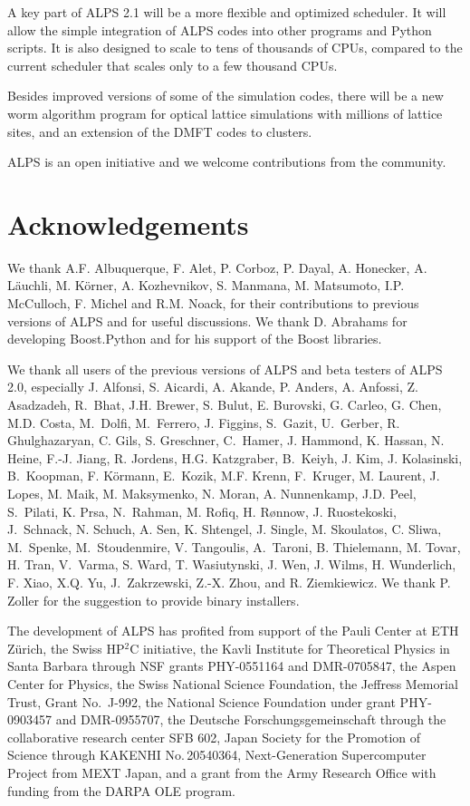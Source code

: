 \documentclass[12pt]{iopart}
\begin{document}
A key part of ALPS 2.1 will be a more flexible and optimized scheduler. It will allow  the simple integration of ALPS codes into other programs and Python scripts. It is also designed to scale to tens of thousands of CPUs, compared to the current scheduler that scales only to a few thousand CPUs. 

Besides improved versions of some of the simulation codes, there will be a new worm algorithm program for optical lattice simulations with millions of lattice sites, and an extension of the DMFT codes to clusters.

ALPS is an open initiative and we welcome contributions from the community.


\section{Acknowledgements}

We thank A.F. Albuquerque, F. Alet, P. Corboz, P. Dayal, A. Honecker, A. L\"auchli, M. K\"orner,  A. Kozhevnikov, S. Manmana, M. Matsumoto, I.P. McCulloch, F. Michel and R.M. Noack, for their contributions to previous versions of ALPS and  for useful discussions. We thank D. Abrahams for developing Boost.Python and for his support of the Boost libraries.

We thank all users of the previous versions of ALPS and beta testers of ALPS 2.0, especially J. Alfonsi, S. Aicardi, A. Akande, P. Anders, A. Anfossi, Z. Asadzadeh, R.~Bhat, J.H. Brewer, S. Bulut, E. Burovski, G. Carleo, G. Chen, M.D. Costa, M.~Dolfi, M.~Ferrero, J. Figgins, S.~Gazit, U.~Gerber, R. Ghulghazaryan, C. Gils, S. Greschner, C.~Hamer, J. Hammond, K. Hassan, N. Heine, F.-J. Jiang, R. Jordens, H.G. Katzgraber, B.~Keiyh, J. Kim, J. Kolasinski, B.~Koopman, F. K\"ormann, E.~Kozik, M.F. Krenn, F.~Kruger, M. Laurent, J. Lopes, M. Maik, M. Maksymenko, N. Moran, A. Nunnenkamp, J.D. Peel, S.~Pilati, K. Prsa, N.~Rahman, M. Rofiq, H. R\o nnow, J. Ruostekoski, J.~Schnack, N. Schuch, A. Sen, K. Shtengel, J. Single, M. Skoulatos, C. Sliwa, M.~Spenke, M.~Stoudenmire, V. Tangoulis, A.~Taroni, B. Thielemann, M. Tovar, H. Tran, V.~Varma, S. Ward, T. Wasiutynski, J. Wen, J. Wilms, H. Wunderlich, F. Xiao, X.Q. Yu, J.~Zakrzewski, Z.-X. Zhou, and R. Ziemkiewicz. We thank P. Zoller for the suggestion to provide binary installers. 

The development of ALPS has profited from support of the Pauli Center at ETH Z\"urich, the Swiss HP$^2$C initiative, the Kavli Institute for Theoretical Physics in Santa Barbara through NSF grants  PHY-0551164 and DMR-0705847, the Aspen Center for Physics, the Swiss National Science Foundation, the Jeffress Memorial Trust, Grant No.~J-992, the National Science Foundation under grant PHY-0903457 and DMR-0955707, the Deutsche Forschungsgemeinschaft through the collaborative research center SFB 602, Japan Society for the Promotion of Science through KAKENHI No.\,20540364, Next-Generation Supercomputer Project from MEXT Japan, and a grant from the Army Research Office with funding from the DARPA OLE program. 
\end{document}
